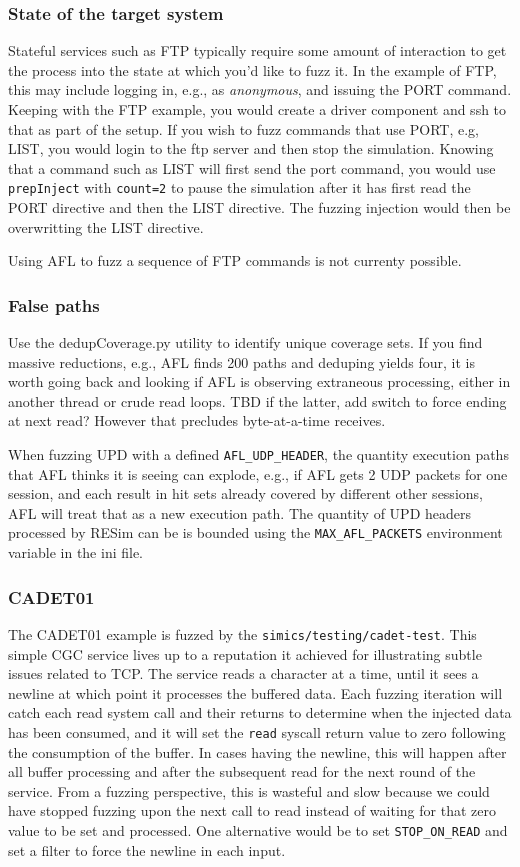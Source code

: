 \documentclass[titlepage]{article}
\begin{document}
\subsubsection{State of the target system}
Stateful services such as FTP typically require some amount of interaction to get the process into the state at which you'd like to fuzz it.
In the example of FTP, this may include logging in, e.g., as \textit{anonymous}, and issuing the PORT command.  Keeping with the FTP example,
you would create a driver component and ssh to that as part of the setup.  If you wish to fuzz commands that use PORT, e.g, LIST, you would
login to the ftp server and then stop the simulation.  Knowing that a command such as LIST will first send the port command, you would use
{\tt prepInject} with {\tt count=2} to pause the simulation after it has first read the PORT directive and then the LIST directive.  The fuzzing
injection would then be overwritting the LIST directive.

Using AFL to fuzz a sequence of FTP commands is not currenty possible.

\subsubsection{False paths}
Use the dedupCoverage.py utility to identify unique coverage sets.  If you find massive reductions, e.g., AFL finds 200 paths and
deduping yields four, it is worth going back and looking if AFL is observing extraneous processing, either in another thread or
crude read loops.  TBD if the latter, add switch to force ending at next read?  However that precludes byte-at-a-time receives.

When fuzzing UPD with a defined {\tt AFL\_UDP\_HEADER}, the quantity execution paths that AFL thinks it is seeing can explode,
e.g., if AFL gets 2 UDP packets for one session, and each result in hit sets already covered by different other sessions, AFL will treat that as a new execution
path.  The quantity of UPD headers processed by RESim can be is bounded using the {\tt MAX\_AFL\_PACKETS} environment variable in the ini file.

\subsubsection{CADET01}
The CADET01 example is fuzzed by the {\tt simics/testing/cadet-test}.  This simple CGC service lives up to a reputation it achieved for 
illustrating subtle issues related to TCP.  The service reads a character at a time, until it sees a newline at which point it processes
the buffered data.  Each fuzzing iteration will
catch each read system call and their returns to determine when the injected data has been consumed, and it will set the {\tt read} syscall return value to
zero following the consumption of the buffer. In cases having the newline, this will happen after all buffer processing and after the subsequent read
for the next round of the service.  From a fuzzing perspective, this is wasteful and slow because we could have stopped fuzzing upon the next call
to read instead of waiting for that zero value to be set and processed.  One alternative would be to set {\tt STOP\_ON\_READ} and set a filter to force
the newline in each input.
\end{document}
